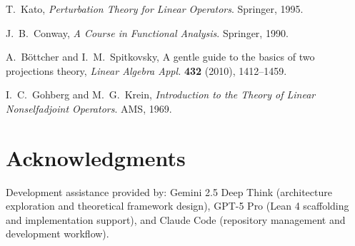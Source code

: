 \documentclass[11pt]{article}
\theoremstyle{definition}
\begin{document}
\begin{thebibliography}{9}

T.~Kato, \emph{Perturbation Theory for Linear Operators}. Springer, 1995.

J.~B.~Conway, \emph{A Course in Functional Analysis}. Springer, 1990.

A.~B\"{o}ttcher and I.~M.~Spitkovsky, A gentle guide to the basics of two projections theory,
\emph{Linear Algebra Appl.} \textbf{432} (2010), 1412--1459.

I.~C.~Gohberg and M.~G.~Krein, \emph{Introduction to the Theory of Linear Nonselfadjoint Operators}. AMS, 1969.

\end{thebibliography}

\section*{Acknowledgments}
Development assistance provided by: Gemini 2.5 Deep Think (architecture exploration and theoretical framework design), GPT-5 Pro (Lean 4 scaffolding and implementation support), and Claude Code (repository management and development workflow).
\end{document}
